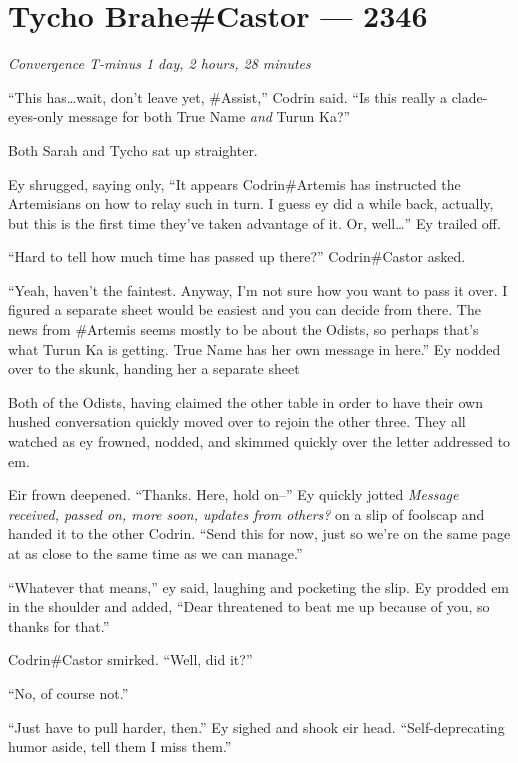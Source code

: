 \hypertarget{tycho-brahecastor-2346}{%
\chapter{Tycho Brahe\#Castor — 2346}\label{tycho-brahecastor-2346}}

\begin{center}
\emph{Convergence T-minus 1 day, 2 hours, 28 minutes}
\end{center}

\noindent ``This has\ldots wait, don't leave yet, \#Assist,'' Codrin said. ``Is this really a clade-eyes-only message for both True Name \emph{and} Turun Ka?''

Both Sarah and Tycho sat up straighter.

Ey shrugged, saying only, ``It appears Codrin\#Artemis has instructed the Artemisians on how to relay such in turn. I guess ey did a while back, actually, but this is the first time they've taken advantage of it. Or, well\ldots{}'' Ey trailed off.

``Hard to tell how much time has passed up there?'' Codrin\#Castor asked.

``Yeah, haven't the faintest. Anyway, I'm not sure how you want to pass it over. I figured a separate sheet would be easiest and you can decide from there. The news from \#Artemis seems mostly to be about the Odists, so perhaps that's what Turun Ka is getting. True Name has her own message in here.'' Ey nodded over to the skunk, handing her a separate sheet

Both of the Odists, having claimed the other table in order to have their own hushed conversation quickly moved over to rejoin the other three. They all watched as ey frowned, nodded, and skimmed quickly over the letter addressed to em.

Eir frown deepened. ``Thanks. Here, hold on--'' Ey quickly jotted \emph{Message received, passed on, more soon, updates from others?} on a slip of foolscap and handed it to the other Codrin. ``Send this for now, just so we're on the same page at as close to the same time as we can manage.''

``Whatever that means,'' ey said, laughing and pocketing the slip. Ey prodded em in the shoulder and added, ``Dear threatened to beat me up because of you, so thanks for that.''

Codrin\#Castor smirked. ``Well, did it?''

``No, of course not.''

``Just have to pull harder, then.'' Ey sighed and shook eir head. ``Self-deprecating humor aside, tell them I miss them.''

